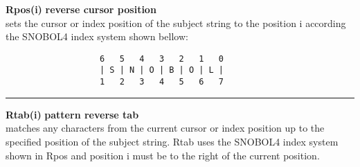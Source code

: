\documentclass{article}
\begin{document}
\noindent\textbf{Rpos(i)} \hfill\textbf{reverse cursor position}\\
sets the cursor or index position of the subject string to the position i according the SNOBOL4 index system shown bellow:
\begin{verbatim}
                   6   5   4   3   2   1   0
                   | S | N | O | B | O | L |
                   1   2   3   4   5   6   7
\end{verbatim}
\noindent\rule{12cm}{0.1pt}

\noindent\textbf{Rtab(i)} \hfill\textbf{pattern reverse tab}\\
matches any characters from the current cursor or index position up to the specified position of the subject string. Rtab uses the SNOBOL4 index system shown in Rpos and position i must be to the right of the current position.\\


\newpage


\end{document}
